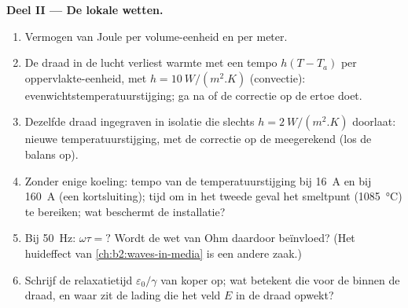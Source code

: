 \begin{problem}
\medskip
\noindent\textbf{Deel II --- De lokale wetten.}
\begin{enumerate}[resume]
  \item Vermogen van Joule per volume-eenheid en per meter.
  \item De draad in de lucht verliest warmte met een tempo $h(T - T_a)$ per
        oppervlakte-eenheid, met $h = \qty{10}{W/(m^2.K)}$ (convectie):
        evenwichtstemperatuurstijging; ga na of de correctie op de
         ertoe doet.
  \item Dezelfde draad ingegraven in isolatie die slechts
        $h =
        \qty{2}{W/(m^2.K)}$ doorlaat: nieuwe temperatuurstijging, met
        de correctie op de  meegerekend (los de balans
        op).
  \item Zonder enige koeling: tempo van de temperatuurstijging bij
        \qty{16}{A} en bij \qty{160}{A} (een kortsluiting); tijd om in het
        tweede geval het smeltpunt (\qty{1085}{\degreeCelsius}) te bereiken;
        wat beschermt de installatie?
  \item Bij \qty{50}{Hz}: $\omega\tau = ?$ Wordt de wet van Ohm daardoor
        beïnvloed? (Het huideffect van \cref{ch:b2:waves-in-media} is een
        andere zaak.)
  \item Schrijf de relaxatietijd $\varepsilon_0/\gamma$ van koper op; wat
        betekent die voor de  binnen de draad, en waar zit
        de lading die het veld $E$ in de draad opwekt?
\end{enumerate}


\end{problem}
